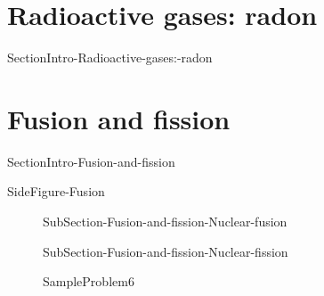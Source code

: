 \documentclass[main.tex]{subfiles}
\begin{document}
\section{Radioactive gases: radon}
{SectionIntro-Radioactive-gases:-radon}



\section{Fusion and fission}
{SectionIntro-Fusion-and-fission}


{SideFigure-Fusion}

\sloppy \begin{description}

\item[] 
{SubSection-Fusion-and-fission-Nuclear-fusion}


\item[] 
{SubSection-Fusion-and-fission-Nuclear-fission}


 

  {SampleProblem6}


\end{description}




\clearpage\thispagestyle{empty}\mbox{}\clearpage
\end{document}
